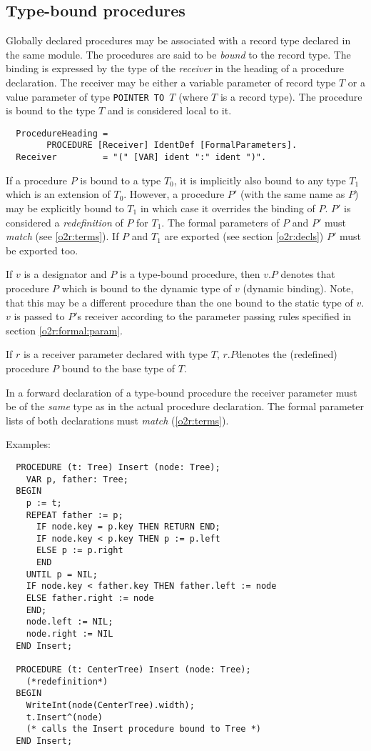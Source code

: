 \subsection{Type-bound procedures}\label{o2r:type:bound}

Globally declared procedures may be associated with a record type
declared in the same module.
The procedures are said to be {\em bound} to the record type. The
binding is expressed by the type of the {\em receiver} in the heading of
a procedure declaration.  The receiver may be either a variable parameter
of record type $T$ or a value parameter of type {\tt POINTER TO $T$}
(where $T$ is a record type).
The procedure is bound to the type $T$ and is considered local to it.
{\BNFsize
\begin{verbatim}
  ProcedureHeading =
        PROCEDURE [Receiver] IdentDef [FormalParameters].
  Receiver         = "(" [VAR] ident ":" ident ")".
\end{verbatim}}
If a procedure $P$ is bound to a type $T_0$, it is implicitly also bound
to any type $T_1$ which is an extension of $T_0$. However, a procedure
$P'$  (with the same name as $P$) may be explicitly bound to $T_1$ in which
case it overrides the binding of $P$. $P'$ is considered a {\em redefinition}
of $P$ for $T_1$. The formal parameters of $P$ and $P'$ must {\em match}
(see \ref{o2r:terms}).
If $P$ and $T_1$ are exported (see section \ref{o2r:decls})
$P'$ must be exported too.

If $v$ is a designator and $P$ is a type-bound procedure, then $v.P$ denotes
that procedure $P$ which is bound to the dynamic type of $v$ (dynamic
binding). Note, that this may be a different procedure than the one
bound to the static type of $v$. $v$ is passed to $P'$s receiver according
to the parameter passing rules specified in section \ref{o2r:formal:param}.

If $r$ is a receiver parameter declared with type $T$, $r.P$\arrow denotes the
(redefined) procedure $P$ bound to the base type of $T$.

In a forward
declaration of a type-bound procedure the receiver parameter must
be of the {\em same} type as in the actual procedure declaration. The formal
parameter lists of both declarations must {\em match} (\ref{o2r:terms}).

\noindent
Examples:
\begin{verbatim}
  PROCEDURE (t: Tree) Insert (node: Tree);
    VAR p, father: Tree;
  BEGIN
    p := t;
    REPEAT father := p;
      IF node.key = p.key THEN RETURN END;
      IF node.key < p.key THEN p := p.left
      ELSE p := p.right
      END
    UNTIL p = NIL;
    IF node.key < father.key THEN father.left := node
    ELSE father.right := node
    END;
    node.left := NIL;
    node.right := NIL
  END Insert;

  PROCEDURE (t: CenterTree) Insert (node: Tree);
    (*redefinition*)
  BEGIN
    WriteInt(node(CenterTree).width);
    t.Insert^(node)
    (* calls the Insert procedure bound to Tree *)
  END Insert;
\end{verbatim}

